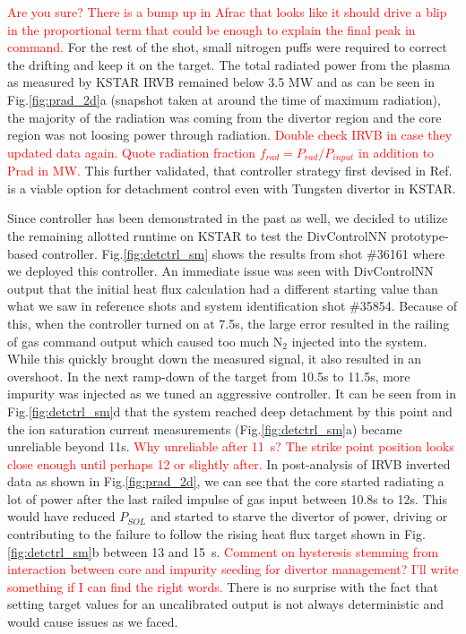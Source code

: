 \textcolor{red}{Are you sure? There is a bump up in Afrac that looks like it should drive a blip in the proportional term that could be enough to explain the final peak in command.}
For the rest of the shot, small nitrogen puffs were required to correct the drifting \Afrac and keep it on the target.
The total radiated power from the plasma as measured by KSTAR \ac{IRVB} remained below 3.5 MW and as can be seen in Fig.\ref{fig:prad_2d}a (snapshot taken at around the time of maximum radiation), the majority of the radiation was coming from the divertor region and the core region was not loosing power through radiation.
\textcolor{red}{Double check IRVB in case they updated data again.}
\textcolor{red}{Quote radiation fraction $f_{rad}=P_{rad}/P_{input}$ in addition to Prad in MW.}
This further validated, that \Afrac controller strategy first devised in Ref.\cite{Eldon_2022_PPCF} is a viable option for detachment control even with Tungsten divertor in KSTAR.

Since \Afrac controller has been demonstrated in the past as well, we decided to utilize the remaining allotted runtime on KSTAR to test the DivControlNN prototype-based controller.
Fig.\ref{fig:detctrl_sm} shows the results from shot \#36161 where we deployed this controller.
An immediate issue was seen with DivControlNN output that the initial heat flux calculation had a different starting value than what we saw in reference shots and system identification shot \#35854.
Because of this, when the controller turned on at 7.5s, the large error resulted in the railing of gas command output which caused too much N$_2$ injected into the system.
While this quickly brought down the measured signal, it also resulted in an overshoot.
In the next ramp-down of the target from 10.5s to 11.5s, more impurity was injected as we tuned an aggressive controller.
It can be seen from \Afrac in Fig.\ref{fig:detctrl_sm}d that the system reached deep detachment by this point and the ion saturation current measurements (Fig.\ref{fig:detctrl_sm}a) became unreliable beyond 11s.
\textcolor{red}{Why unreliable after 11~s? The strike point position looks close enough until perhaps 12 or slightly after.}
In post-analysis of IRVB inverted data as shown in Fig.\ref{fig:prad_2d}, we can see that the core started radiating a lot of power after the last railed impulse of gas input between 10.8s to 12s.
This would have reduced $P_{SOL}$ and started to starve the divertor of power, driving or contributing to the failure to follow the rising heat flux target shown in Fig.\ref{fig:detctrl_sm}b between 13 and 15~s.
\textcolor{red}{Comment on hysteresis stemming from interaction between core and impurity seeding for divertor management? I'll write something if I can find the right words.}
There is no surprise with the fact that setting target values for an uncalibrated output is not always deterministic and would cause issues as we faced.

